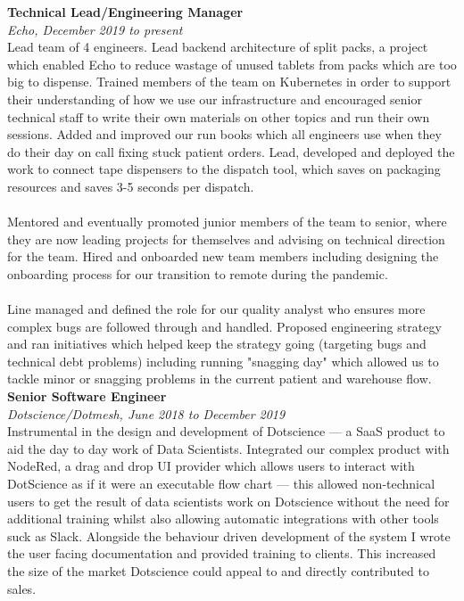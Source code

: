 \documentclass{article}
\begin{document}
\begin{flushleft}
\textbf{Technical Lead/Engineering Manager}\\
\textit{Echo, December 2019 to present}\\[5pt]
Lead team of 4 engineers. Lead backend architecture of split packs, a project which enabled Echo to reduce wastage of unused tablets from packs which are too big to dispense. Trained members of the team on Kubernetes in order to support their understanding of how we use our infrastructure and encouraged senior technical staff to write their own materials on other topics and run their own sessions. Added and improved our run books which all engineers use when they do their day on call fixing stuck patient orders. Lead, developed and deployed the work to connect tape dispensers to the dispatch tool, which saves on packaging resources and saves 3-5 seconds per dispatch.

\paragraph{}Mentored and eventually promoted junior members of the team to senior, where they are now leading projects for themselves and advising on technical direction for the team. Hired and onboarded new team members including designing the onboarding process for our transition to remote during the pandemic.

\paragraph{}Line managed and defined the role for our quality analyst who ensures more complex bugs are followed through and handled. Proposed engineering strategy and ran initiatives which helped keep the strategy going (targeting bugs and technical debt problems) including running "snagging day" which allowed us to tackle minor or snagging problems in the current patient and warehouse flow.\\[10pt]

\textbf{Senior Software Engineer}\\
\textit{Dotscience/Dotmesh, June 2018 to December 2019}\\[5pt]
Instrumental in the design and development of Dotscience — a SaaS product to aid the day to day work of Data Scientists. Integrated our complex product with NodeRed, a drag and drop UI provider which allows users to interact with DotScience as if it were an executable flow chart — this allowed non-technical users to get the result of data scientists work on Dotscience without the need for additional training whilst also allowing automatic integrations with other tools suck as Slack. Alongside the behaviour driven development of the system I wrote the user facing documentation and provided training to clients. This increased the size of the market Dotscience could appeal to and directly contributed to sales.


\end{flushleft}
\end{document}
